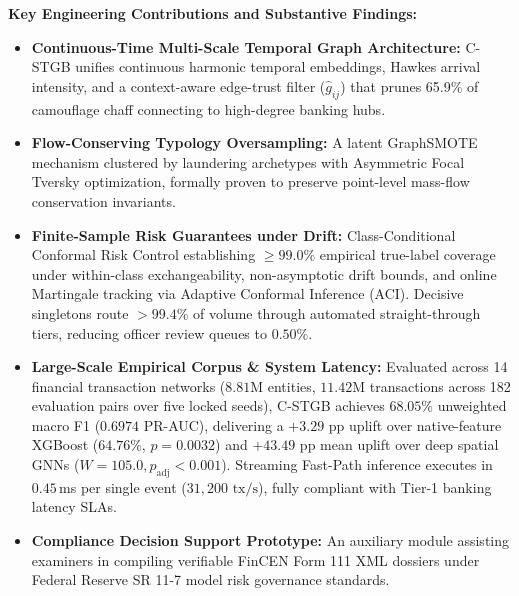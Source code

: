 \documentclass[11pt,a4paper]{article}
\begin{document}
\vspace{0.6em}
\noindent
\textbf{Key Engineering Contributions and Substantive Findings:}
\begin{itemize}[leftmargin=*,itemsep=2pt,topsep=2pt]
    \item \textbf{Continuous-Time Multi-Scale Temporal Graph Architecture:} C-STGB unifies continuous harmonic temporal embeddings, Hawkes arrival intensity, and a context-aware edge-trust filter ($\hat{g}_{ij}$) that prunes 65.9\% of camouflage chaff connecting to high-degree banking hubs.
    \item \textbf{Flow-Conserving Typology Oversampling:} A latent GraphSMOTE mechanism clustered by laundering archetypes with Asymmetric Focal Tversky optimization, formally proven to preserve point-level mass-flow conservation invariants.
    \item \textbf{Finite-Sample Risk Guarantees under Drift:} Class-Conditional Conformal Risk Control establishing $\ge 99.0\%$ empirical true-label coverage under within-class exchangeability, non-asymptotic drift bounds, and online Martingale tracking via Adaptive Conformal Inference (ACI). Decisive singletons route $>99.4\%$ of volume through automated straight-through tiers, reducing officer review queues to $0.50\%$.
    \item \textbf{Large-Scale Empirical Corpus \& System Latency:} Evaluated across 14 financial transaction networks ($8.81\text{M}$ entities, $11.42\text{M}$ transactions across 182 evaluation pairs over five locked seeds), C-STGB achieves $68.05\%$ unweighted macro F1 ($0.6974$ PR-AUC), delivering a $+3.29\text{ pp}$ uplift over native-feature XGBoost ($64.76\%$, $p=0.0032$) and $+43.49\text{ pp}$ mean uplift over deep spatial GNNs ($W=105.0, p_{\text{adj}} < 0.001$). Streaming Fast-Path inference executes in $0.45$\,ms per single event ($31,200\text{ tx/s}$), fully compliant with Tier-1 banking latency SLAs.
    \item \textbf{Compliance Decision Support Prototype:} An auxiliary module assisting examiners in compiling verifiable FinCEN Form 111 XML dossiers under Federal Reserve SR 11-7 model risk governance standards.
\end{itemize}
\end{document}
